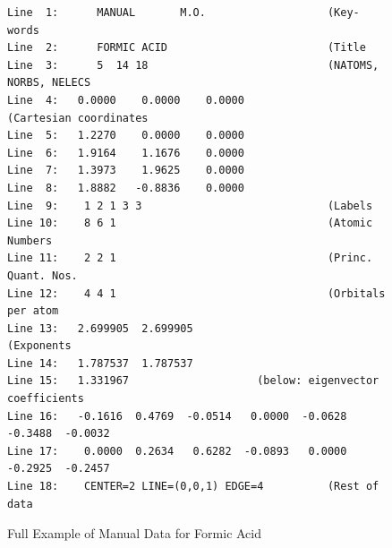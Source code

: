 \begin{figure}
\begin{makeimage}
\end{makeimage}
\compresstable
\begin{verbatim}
Line  1:      MANUAL       M.O.                   (Key-words
Line  2:      FORMIC ACID                         (Title
Line  3:      5  14 18                            (NATOMS, NORBS, NELECS
Line  4:   0.0000    0.0000    0.0000             (Cartesian coordinates
Line  5:   1.2270    0.0000    0.0000
Line  6:   1.9164    1.1676    0.0000
Line  7:   1.3973    1.9625    0.0000
Line  8:   1.8882   -0.8836    0.0000
Line  9:    1 2 1 3 3                             (Labels
Line 10:    8 6 1                                 (Atomic Numbers
Line 11:    2 2 1                                 (Princ. Quant. Nos.
Line 12:    4 4 1                                 (Orbitals per atom
Line 13:   2.699905  2.699905                     (Exponents
Line 14:   1.787537  1.787537
Line 15:   1.331967                    (below: eigenvector coefficients
Line 16:   -0.1616  0.4769  -0.0514   0.0000  -0.0628  -0.3488  -0.0032
Line 17:    0.0000  0.2634   0.6282  -0.0893   0.0000  -0.2925  -0.2457
Line 18:    CENTER=2 LINE=(0,0,1) EDGE=4          (Rest of data
\end{verbatim}
\caption{\label{d_hcooh} Full Example of Manual Data for Formic Acid}
\end{figure}

